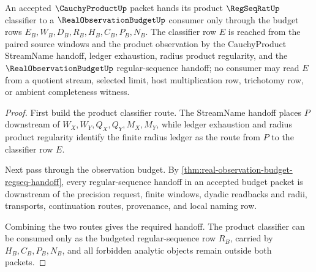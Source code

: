 \begin{theorem}
\label{thm:cauchy-product-observation-budget-regseq-handoff}
An accepted $\CauchyProductUp$ packet hands its product $\RegSeqRatUp$ classifier to a $\RealObservationBudgetUp$ consumer only through the budget rows $E_B,W_B,D_B,R_B,H_B,C_B,P_B,N_B$. The classifier row $E$ is reached from the paired source windows and the product observation by the CauchyProduct StreamName handoff, ledger exhaustion, radius product regularity, and the $\RealObservationBudgetUp$ regular-sequence handoff; no consumer may read $E$ from a quotient stream, selected limit, host multiplication row, trichotomy row, or ambient completeness witness.
\end{theorem}
\begin{proof}
First build the product classifier route. The StreamName handoff places $P$ downstream of $W_X,W_Y,Q_X,Q_Y,M_X,M_Y$, while ledger exhaustion and radius product regularity identify the finite radius ledger as the route from $P$ to the classifier row $E$.

Next pass through the observation budget. By \autoref{thm:real-observation-budget-regseq-handoff}, every regular-sequence handoff in an accepted budget packet is downstream of the precision request, finite windows, dyadic readbacks and radii, transports, continuation routes, provenance, and local naming row.

Combining the two routes gives the required handoff. The product classifier can be consumed only as the budgeted regular-sequence row $R_B$, carried by $H_B,C_B,P_B,N_B$, and all forbidden analytic objects remain outside both packets.
\end{proof}

